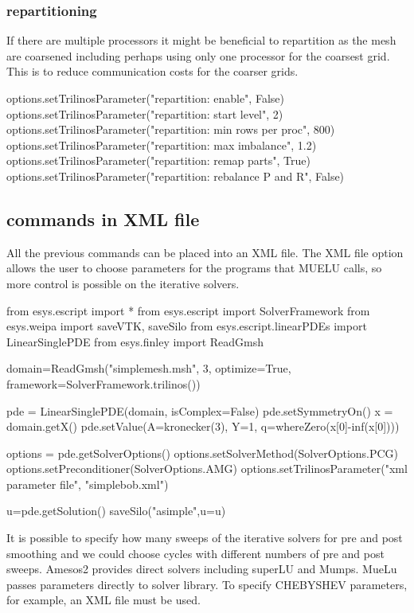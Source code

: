 \subsubsection{repartitioning}
If there are multiple processors it might be beneficial to repartition as the mesh are coarsened including perhaps using only one processor for the coarsest grid.  This is to reduce communication costs for the coarser grids.
\begin{python}
options.setTrilinosParameter("repartition: enable", False)
options.setTrilinosParameter("repartition: start level", 2)
options.setTrilinosParameter("repartition: min rows per proc", 800)
options.setTrilinosParameter("repartition: max imbalance", 1.2)
options.setTrilinosParameter("repartition: remap parts", True)
options.setTrilinosParameter("repartition: rebalance P and R", False)
\end{python}


\subsection{commands in XML file}
All the previous commands can be placed into an XML file.  The XML file option allows the user to choose parameters for the programs that MUELU calls, so more control is possible on the iterative solvers.
\begin{python}
from esys.escript import *
from esys.escript import SolverFramework
from esys.weipa import saveVTK, saveSilo
from esys.escript.linearPDEs import LinearSinglePDE
from esys.finley import ReadGmsh

domain=ReadGmsh("simplemesh.msh", 3, optimize=True,
                framework=SolverFramework.trilinos())

pde = LinearSinglePDE(domain, isComplex=False)
pde.setSymmetryOn()
x = domain.getX()
pde.setValue(A=kronecker(3), Y=1, q=whereZero(x[0]-inf(x[0])))

options = pde.getSolverOptions()
options.setSolverMethod(SolverOptions.PCG)
options.setPreconditioner(SolverOptions.AMG)
options.setTrilinosParameter("xml parameter file", "simplebob.xml")

u=pde.getSolution()
saveSilo("asimple",u=u)
\end{python}

It is possible to specify how many sweeps of the iterative solvers for pre and post smoothing and we could choose cycles with different numbers of pre and post sweeps.  Amesos2 provides direct solvers including superLU and Mumps. MueLu passes parameters directly to solver library.  To specify CHEBYSHEV parameters, for example, an XML file must be used.

